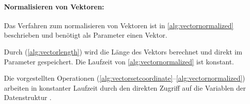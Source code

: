 
\paragraph{Normalisieren von Vektoren:} %
\label{par:normalisieren_von_vektoren}

Das Verfahren zum normalisieren von Vektoren ist in \autoref{alg:vectornormalized} beschrieben und benötigt als
 Parameter einen Vektor.

Durch  (\autoref{alg:vectorlength}) wird die Länge des Vektors berechnet und direkt im Parameter gespeichert. Die Laufzeit von \autoref{alg:vectornormalized} ist konstant.


Die vorgestellten Operationen (\autoref{alg:vectorsetcoordinate}--\autoref{alg:vectornormalized}) arbeiten in konstanter Laufzeit durch den direkten Zugriff auf die Variablen der Datenstruktur .

